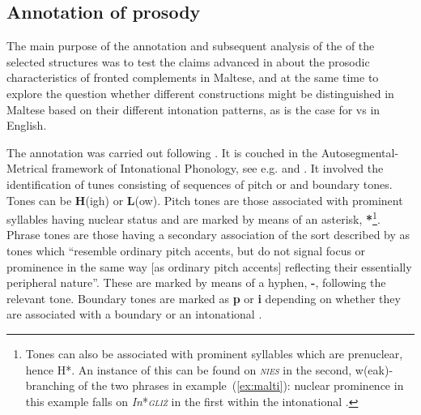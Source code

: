 \documentclass[output=paper]{LSP/langsci}
\begin{document}
  \subsection{Annotation of prosody}


The main purpose of the annotation and subsequent analysis of the
 of the selected structures was to test the claims advanced in
\citet{BorgAlexander2009} about the prosodic characteristics of
fronted complements in Maltese, and at the same time to explore the
question whether different constructions might be distinguished in
Maltese based on their different intonation patterns, as is the case
for  vs  in English.

The annotation was carried out following \citet{Vella1995, Vella2003,
  Vella2009}. It is couched in the Autosegmental-Metrical framework of
Intonational Phonology, see e.g.  \citet{Pierrehumbert80} and
  \citet{Ladd2008}. It involved the identification of tunes consisting of
sequences of pitch or  and boundary tones.  Tones can be
\textbf{H}(igh) or \textbf{L}(ow). Pitch  tones are those associated
with prominent syllables having nuclear status and are marked by means
of an asterisk, \textbf{*}\footnote{Tones can also be associated with
  prominent syllables which are prenuclear, hence H*. An instance of
  this can be found on {\textit{\textsc {nies}}} in the second,
  w(eak)-branching of the two  phrases in
  example~(\ref{ex:malti}): nuclear prominence in this example falls
  on {\it In}*{\textit {\textsc {gliż}}} in the first 
   within the intonational .}. Phrase  tones are
those having a secondary association of the sort described by
\citet[180]{grice2000place} as tones which ``resemble ordinary pitch
accents, but do not signal focus or prominence in the same way [as
  ordinary pitch accents] reflecting their essentially peripheral
nature''. These are marked by means of a hyphen, \textbf{-}, following
the relevant tone. Boundary tones are marked as \textbf{p} or \textbf{i}
depending on whether they are associated with a  
boundary or an intonational .
\end{document}
